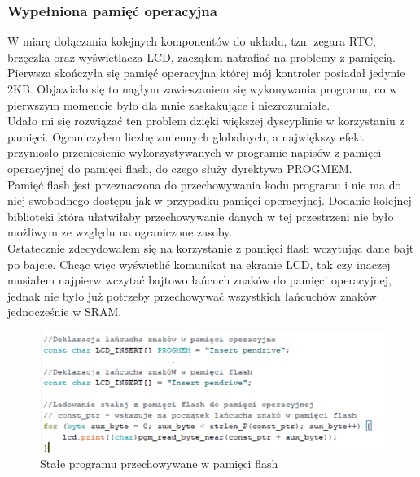 \documentclass[declaration,shortabstract, mgr]{iithesis}
\begin{document}
\subsubsection{Wypełniona pamięć operacyjna}
\indent W miarę dołączania kolejnych komponentów do układu, tzn. zegara RTC, brzęczka oraz wyświetlacza LCD, zacząłem natrafiać na problemy z pamięcią. \\
\indent Pierwsza skończyła się pamięć operacyjna której mój kontroler posiadał jedynie 2KB. Objawiało się to nagłym zawieszaniem się wykonywania programu, co w pierwszym momencie było dla mnie zaskakujące i niezrozumiałe.\\
\indent Udało mi się rozwiązać ten problem dzięki większej dyscyplinie w korzystaniu z pamięci. Ograniczyłem liczbę zmiennych globalnych, a największy efekt przyniosło przeniesienie wykorzystywanych w programie napisów z pamięci operacyjnej do pamięci flash, do czego służy dyrektywa PROGMEM.\\
\indent Pamięć flash jest przeznaczona do przechowywania kodu programu i nie ma do niej swobodnego dostępu jak w przypadku pamięci operacyjnej. Dodanie kolejnej biblioteki która ułatwiłaby przechowywanie danych w tej przestrzeni nie było możliwym ze względu na ograniczone zasoby.\\
\indent Ostatecznie zdecydowałem się na korzystanie z pamięci flash wczytując dane bajt po bajcie. Chcąc więc wyświetlić komunikat na ekranie LCD, tak czy inaczej musiałem najpierw wczytać bajtowo łańcuch znaków do pamięci operacyjnej, jednak nie było już potrzeby przechowywać wszystkich łańcuchów znaków jednocześnie w SRAM.
\begin{figure}[h]
\caption{Stałe programu przechowywane w pamięci flash}
\centering
\includegraphics[scale=0.8]{progmem.png}
\end{figure}
\end{document}

